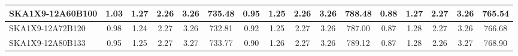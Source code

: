 \begin{table}[H]
{{\begin{tabular}{|lccccc||ccccc||ccccc|}
SKA1X9-12A60B100 & 1.03 \cellcolor{blue!44.97} & 1.27 \cellcolor{red!29.12} & 2.26 \cellcolor{green!38.12} & 3.26 \cellcolor{orange!18.00} & 735.48 \cellcolor{purple!27.04} & 0.95 \cellcolor{blue!41.83} & 1.25 \cellcolor{red!18.00} & 2.26 \cellcolor{green!46.00} & 3.26 \cellcolor{orange!32.00} & 788.48 \cellcolor{purple!30.88} & 0.88 \cellcolor{blue!26.50} & 1.27 \cellcolor{red!29.22} & 2.27 \cellcolor{green!60.00} & 3.26 \cellcolor{orange!33.17} & 765.54 \cellcolor{purple!40.91}\\ \hline 
SKA1X9-12A72B120 & 0.98 \cellcolor{blue!27.15} & 1.24 \cellcolor{red!18.00} & 2.27 \cellcolor{green!60.00} & 3.26 \cellcolor{orange!20.05} & 732.81 \cellcolor{purple!18.00} & 0.92 \cellcolor{blue!27.13} & 1.25 \cellcolor{red!20.60} & 2.27 \cellcolor{green!55.72} & 3.26 \cellcolor{orange!25.54} & 787.00 \cellcolor{purple!18.00} & 0.87 \cellcolor{blue!18.37} & 1.28 \cellcolor{red!43.72} & 2.27 \cellcolor{green!57.04} & 3.26 \cellcolor{orange!18.00} & 766.68 \cellcolor{purple!47.42}\\ \hline 
SKA1X9-12A80B133 & 0.95 \cellcolor{blue!18.00} & 1.25 \cellcolor{red!19.22} & 2.27 \cellcolor{green!51.82} & 3.27 \cellcolor{orange!50.78} & 733.77 \cellcolor{purple!21.24} & 0.90 \cellcolor{blue!18.00} & 1.26 \cellcolor{red!26.54} & 2.27 \cellcolor{green!60.00} & 3.26 \cellcolor{orange!44.92} & 789.12 \cellcolor{purple!36.43} & 0.87 \cellcolor{blue!18.00} & 1.28 \cellcolor{red!53.84} & 2.26 \cellcolor{green!18.00} & 3.27 \cellcolor{orange!58.83} & 768.90 \cellcolor{purple!60.00}\\ \hline 
\end{tabular}}
\vspace{-0.300000cm}
\hspace{1cm} 
}
\end{table}
